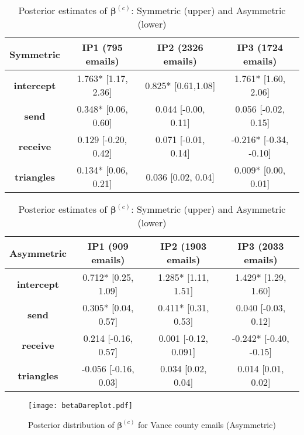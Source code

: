 \documentclass[a4paper]{article}
\begin{document}
		\begin{table}[ht]
			\centering
			\begin{tabular}{|c|c|c|c|} 
				\hline
				\textbf{Symmetric}& \textbf{IP1} (795 emails) & \textbf{IP2} (2326 emails) &\textbf{IP3} (1724 emails) \\
				\hline
				\textbf{intercept} & 1.763* [1.17, 2.36]& 0.825* [0.61,1.08]& 1.761* [1.60, 2.06]\\
				\textbf{send}&  0.348* [0.06, 0.60]& 0.044 [-0.00, 0.11]& 0.056 [-0.02, 0.15]\\
				\textbf{receive}& 0.129 [-0.20, 0.42]& 0.071 [-0.01, 0.14]& -0.216* [-0.34, -0.10]\\
				\textbf{triangles} & 0.134* [0.06, 0.21]&  0.036 [0.02, 0.04]& 0.009* [0.00, 0.01]\\
				\hline
			\end{tabular}
			\begin{tabular}{|c|c|c|c|} 
				\hline
				\textbf{Asymmetric}& \textbf{IP1} (909 emails) & \textbf{IP2} (1903 emails) &\textbf{IP3} (2033 emails) \\
				\hline
				\textbf{intercept} &0.712* [0.25, 1.09]& 1.285* [1.11, 1.51]& 1.429* [1.29, 1.60]\\
				\textbf{send}&  0.305* [0.04, 0.57]& 0.411* [0.31, 0.53]& 0.040 [-0.03, 0.12]\\
				\textbf{receive}& 0.214 [-0.16, 0.57]& 0.001 [-0.12, 0.091]& -0.242* [-0.40, -0.15]\\
				\textbf{triangles} & -0.056 [-0.16, 0.03]&  0.034 [0.02, 0.04]& 0.014 [0.01, 0.02]\\
				\hline
			\end{tabular}
			\caption {Posterior estimates of $\boldsymbol{\beta}^{(c)}$: Symmetric (upper) and Asymmetric (lower)}
			\label{table:Vancebeta}
		\end{table}
		\normalsize 	
		\begin{figure}[ht]
			\centering
			\texttt{[image: betaDareplot.pdf]} 
			\caption{Posterior distribution of  $\boldsymbol{\beta}^{(c)}$ for Vance county emails (Asymmetric)}
			\label{fig:Vanceboxplot}
		\end{figure}
\end{document}
